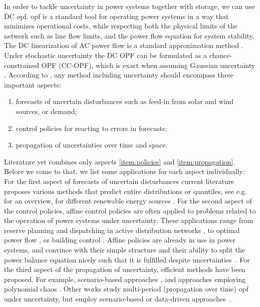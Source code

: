 \documentclass[final,3p,times,twocolumn]{elsarticle}  %
\begin{document}
In order to tackle uncertainty in power systems together with storage, we can use DC \gls{opf}. \Gls{opf} is a standard tool for operating power systems in a way that minimizes operational costs, while respecting both the physical limits of the network such as line flow limits, and the power flow equation for system stability. The DC linearization of AC power flow is a standard approximation method \cite{wood_power_nodate}. Under stochastic uncertainty the DC OPF can be formulated as a chance-constrained OPF (CC-OPF), which is exact when assuming Gaussian uncertainty \cite{Muehlpfordt18c}. According to \cite{Warrington13}, any method including uncertainty should encompass three important aspects:
\begin{enumerate}
\itemsep0em 
	\item \label{item:forecasts} forecasts of uncertain disturbances such as feed-in from solar and wind sources, or demand;
	\item \label{item:policies} control policies for reacting to errors in forecasts;
	\item \label{item:propagation} propagation of uncertainties over time and space.
\end{enumerate}
Literature yet combines only aspects \ref{item:policies} and \ref{item:propagation}. Before we come to that, we list some applications for each aspect individually:
For the first aspect of forecasts of uncertain disturbances current literature proposes various methods that predict entire distributions or quantiles, see e.g. \cite{Hong16} for an overview, for different renewable energy sources \cite{quatile_zhang_2020, quantile_solar_2017}. 
For the second aspect of the control policies, affine control policies are often applied to problems related to the operation of power systems under uncertainty. These applications range from reserve planning \cite{Warrington13,Ding16,Bucher17} and dispatching in active distribution networks \cite{Fabietti17,Fabietti18}, to optimal power flow \cite{Vrakopoulou13b,Vrakopoulou17,Muehlpfordt18c,Louca16,MunozAlvarez14}, or building control \cite{Oldewurtel12}. 
Affine policies are already in use in power systems, and convince with their simple structure and their ability to split the power balance equation nicely such that it is fulfilled despite uncertainties~\cite{Muehlpfordt18c}.
For the third aspect of the propagation of uncertainty, efficient methods have been proposed. For example, scenario-based approaches \cite{Capitanescu12,Fabietti17,Vrakopoulou17}, and approaches employing polynomial chaos \cite{Muehlpfordt17a,Muehlpfordt16b,Muehlpfordt18c}. Other works study multi-period (propagation over time) \gls{opf} under uncertainty, but employ scenario-based or data-driven approaches~\cite{Vrakopoulou13,Vrakopoulou17b,Capitanescu12,Guo18}.
\end{document}
